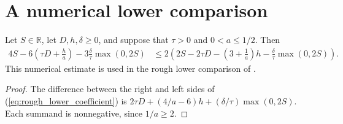 \section{A numerical lower comparison}

\begin{theorem}
    \label{thm:rough_lower_coefficient_three}
    \leanok
    Let $S\in\mathbb R$, let $D,h,\delta\geq 0$, and suppose that
    $\tau>0$ and $0<a\leq 1/2$. Then
    \begin{align}
        4S-6\left(\tau D+\frac h a\right)
          -3\frac\delta\tau\max(0,2S)
        &\leq
        2\left(2S-2\tau D-\left(3+\frac1a\right)h
          -\frac\delta\tau\max(0,2S)\right).
        \label{eq:rough_lower_coefficient}
    \end{align}
    This numerical estimate is used in the rough lower comparison of
    \cite[Section~8]{OpenAI2026AreaLaw}.
\end{theorem}
\begin{proof}
    \leanok
    The difference between the right and left sides of
    (\ref{eq:rough_lower_coefficient}) is
    $2\tau D+(4/a-6)h+(\delta/\tau)\max(0,2S)$.
    Each summand is nonnegative, since $1/a\geq 2$.
\end{proof}
